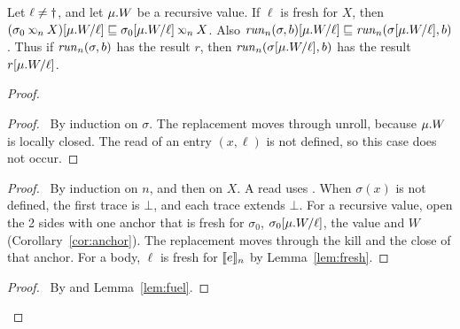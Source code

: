 \begin{lem}\label{lem:subenv}
  Let $\ell\neq\dagger$, and let $\mu.{W}$ be a recursive value.
  If $\ell$ is fresh for $X$, then $\repl{(\sigma_0\lk{n}X)}{W}{\ell}\ext\repl{\sigma_0}{W}{\ell}\lk{n}X$.
  Also ${\mathit{run}_{n}(\sigma,b)}[\mu.{W}/{\ell}]\sqsubseteq\mathit{run}_{n}({\sigma}[\mu.{W}/{\ell}],b)$.
  Thus if $\mathit{run}_{n}(\sigma,b)$ has the result $r$, then $\mathit{run}_{n}({\sigma}[\mu.{W}/{\ell}],b)$ has the result ${r}[\mu.{W}/{\ell}]$.
\end{lem}
\begin{proof}
  \begin{proof}
    \pf\ By induction on $\sigma$.
    The replacement moves through unroll, because $\mu.{W}$ is locally closed.
    The read of an entry $(x,\ell)$ is not defined, so this case does not occur.
  \end{proof}
  \begin{proof}
    \pf\ By induction on $n$, and then on $X$.
    A read uses .
    When $\sigma(x)$ is not defined, the first trace is $\bot$, and each trace extends $\bot$.
    For a recursive value, open the 2 sides with one anchor that is fresh for $\sigma_0$, ${\sigma_0}[\mu.{W}/{\ell}]$, the value and $W$ (Corollary~\ref{cor:anchor}).
    The replacement moves through the kill and the close of that anchor.
    For a body, $\ell$ is fresh for $\llbracket{e}\rrbracket_{n}$ by Lemma~\ref{lem:fresh}.
  \end{proof}
  \qedstep
  \begin{proof}
    \pf\ By  and Lemma~\ref{lem:fuel}.
  \end{proof}
\end{proof}

